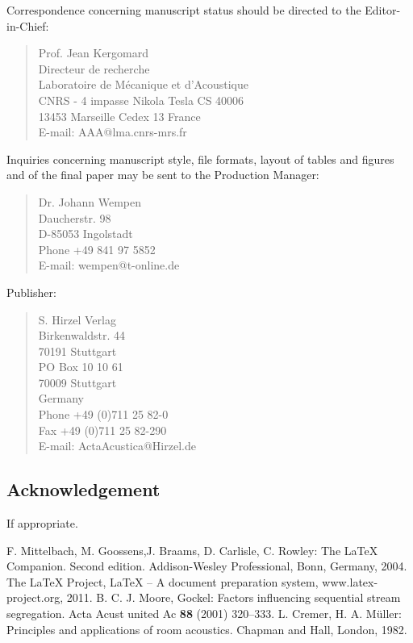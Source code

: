 \documentclass[twocolumn]{article}
\begin{document}
Correspondence concerning manuscript status should be directed to
the Editor-in-Chief: 
\begin{quote}
Prof. Jean Kergomard \\
 Directeur de recherche \\
 Laboratoire de Mécanique et d'Acoustique\\
 CNRS - 4 impasse Nikola Tesla CS 40006\\
 13453 Marseille Cedex 13 France\\
 E-mail: AAA@lma.cnrs-mrs.fr 
\end{quote}
Inquiries concerning manuscript style, file formats, layout of tables
and figures and of the final paper may be sent to the Production Manager: 
\begin{quote}
Dr. Johann Wempen\\
 Daucherstr. 98\\
 D-85053 Ingolstadt\\
 Phone +49 841 97 5852\\
 E-mail: wempen@t-online.de 
\end{quote}
\noindent Publisher: 
\begin{quote}
S. Hirzel Verlag\\
 Birkenwaldstr. 44\\
 70191 Stuttgart\\
 PO Box 10 10 61\\
 70009 Stuttgart\\
 Germany\\
 Phone +49 (0)711 25 82-0\\
 Fax +49 (0)711 25 82-290\\
 E-mail: ActaAcustica@Hirzel.de 
\end{quote}

\subsection*{Acknowledgement}

If appropriate.

\small

\begin{thebibliography}{1}
 F. Mittelbach, M. Goossens,J. Braams, D. Carlisle, C.
   Rowley: The LaTeX Companion. {S}econd edition. Addison-Wesley
   Professional, Bonn, Germany, 2004.
 The LaTeX Project, LaTeX -- {A} document preparation
   system, www.latex-project.org, 2011.
 B. C. J. Moore, Gockel: Factors influencing sequential
   stream segregation. Acta Acust united Ac \textbf{88} (2001) 320--333.
 L. Cremer, H. A. M\"uller: Principles and applications
   of room acoustics. Chapman and Hall, London, 1982.
\end{thebibliography}
\end{document}
